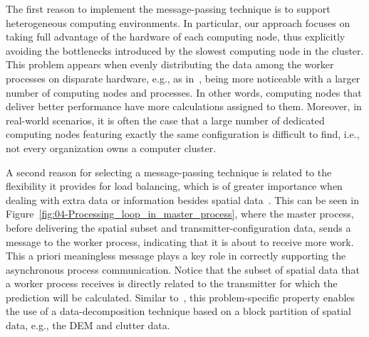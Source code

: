 The first reason to implement the message-passing technique is to
support heterogeneous computing environments. In particular, our approach
focuses on taking full advantage of the hardware of each computing
node, thus explicitly avoiding the bottlenecks introduced by the slowest
computing node in the cluster. This problem appears when evenly distributing
the data among the worker processes on disparate hardware, e.g., as
in~\cite{Akhter_Porting_GRASS_raster_module_to_distributed_computing:2007,Huang-Explorations_of_the_implementation_of_a_parallel_IDW_algorithm_in_a_Linux_cluster:2011},
being more noticeable with a larger number of computing nodes and
processes. In other words, computing nodes that deliver better performance
have more calculations assigned to them. Moreover, in real-world scenarios,
it is often the case that a large number of dedicated computing nodes
featuring exactly the same configuration is difficult to find, i.e.,
not every organization owns a computer cluster.

A second reason for selecting a message-passing technique is related
to the flexibility it provides for load balancing, which is of greater
importance when dealing with extra data or information besides spatial
data~\cite{Hawick_Distributed_frameworks_and_parallel_algorithms_for_processing_large_scala_geographic_data:2003}.
This can be seen in Figure~\ref{fig:04-Processing_loop_in_master_process},
where the master process, before delivering the spatial subset and
transmitter-configuration data, sends a message to the worker process,
indicating that it is about to receive more work. This a priori meaningless
message plays a key role in correctly supporting the asynchronous
process communication. Notice that the subset of spatial data that
a worker process receives is directly related to the transmitter for
which the prediction will be calculated. Similar to~\cite{Tabik-High_performance_three_horizon_composition_algorithm_for_large_scale_terrains:2011,Tabik-Optimal_tilt_and_orientation_maps_a_multi_algorithm_approach_for_heterogeneous_multicore_GPU_systems:2013},
this problem-specific property enables the use of a data-decomposition
technique based on a block partition of spatial data, e.g., the DEM
and clutter data.

